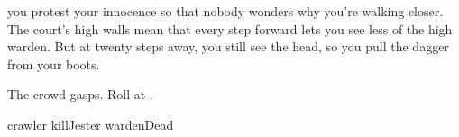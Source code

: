 you protest your innocence so that nobody wonders why you're walking closer.
The \gls{court}'s high walls mean that every \gls{step} forward lets you see less of the high \gls{warden}.
But at twenty \glspl{step} away, you still see the head, so you pull the dagger from your boots.

The crowd gasps.
Roll  at \tn[11].

\begin{selectPath}
  {}%
  {crawler}
  {}%
  {killJester}
  {}%
  {wardenDead}
\end{selectPath}


